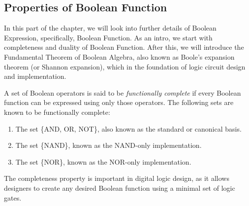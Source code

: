     \subsection{Properties of Boolean Function}
    In this part of the chapter, we will look into further details of Boolean Expression, specifically, Boolean Function. As an intro, we start with completeness
    and duality of Boolean Function. After this, we will introduce the Fundamental Theorem of Boolean Algebra, also known as Boole's expansion theorem (or Shannon expansion), 
    which in the foundation of logic circuit design and implementation.
    \begin{definition}
        A set of Boolean operators is said to be \textit{functionally complete} if every Boolean function can be expressed using only those operators. The following sets are known to be functionally complete:

        \begin{enumerate}
            \item The set \{AND, OR, NOT\}, also known as the standard or canonical basis.
            \item The set \{NAND\}, known as the NAND-only implementation.
            \item The set \{NOR\}, known as the NOR-only implementation.
        \end{enumerate}

        The completeness property is important in digital logic design, as it allows designers to create any desired Boolean function using a minimal set of logic gates.
    \end{definition}

